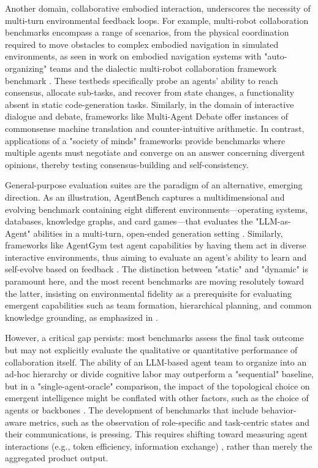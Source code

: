 \documentclass[11pt,a4paper]{article}
\begin{document}
Another domain, collaborative embodied interaction, underscores the necessity of multi-turn environmental feedback loops. For example, multi-robot collaboration benchmarks encompass a range of scenarios, from the physical coordination required to move obstacles to complex embodied navigation in simulated environments, as seen in work on embodied navigation systems with "auto-organizing" teams and the dialectic multi-robot collaboration framework benchmark \cite{arxiv:2403.08282v2,arxiv:2307.04738v1}. These testbeds specifically probe an agents' ability to reach consensus, allocate sub-tasks, and recover from state changes, a functionality absent in static code-generation tasks. Similarly, in the domain of interactive dialogue and debate, frameworks like Multi-Agent Debate \cite{arxiv:2305.19118v1} offer instances of commonsense machine translation and counter-intuitive arithmetic. In contrast, applications of a "society of minds" frameworks \cite{arxiv:2309.13007v2} provide benchmarks where multiple agents must negotiate and converge on an answer concerning divergent opinions, thereby testing consensus-building and self-consistency.

General-purpose evaluation suites are the paradigm of an alternative, emerging direction. As an illustration, AgentBench captures a multidimensional and evolving benchmark containing eight different environments---operating systems, databases, knowledge graphs, and card games---that evaluates the "LLM-as-Agent" abilities in a multi-turn, open-ended generation setting \cite{arxiv:2308.03688v2}. Similarly, frameworks like AgentGym test agent capabilities by having them act in diverse interactive environments, thus aiming to evaluate an agent's ability to learn and self-evolve based on feedback \cite{arxiv:2406.04151v1}. The distinction between "static" and "dynamic" is paramount here, and the most recent benchmarks are moving resolutely toward the latter, insisting on environmental fidelity as a prerequisite for evaluating emergent capabilities such as team formation, hierarchical planning, and common knowledge grounding, as emphasized in \cite{arxiv:2406.07155v1}.

However, a critical gap persists: most benchmarks assess the final task outcome but may not explicitly evaluate the qualitative or quantitative performance of collaboration itself. The ability of an LLM-based agent team to organize into an ad-hoc hierarchy or divide cognitive labor may outperform a "sequential" baseline, but in a "single-agent-oracle" comparison, the impact of the topological choice on emergent intelligence might be conflated with other factors, such as the choice of agents or backbones \cite{arxiv:2310.02170v1,arxiv:2308.05960v1}. The development of benchmarks that include behavior-aware metrics, such as the observation of role-specific and task-centric states and their communications, is pressing. This requires shifting toward measuring agent interactions (e.g., token efficiency, information exchange) \cite{arxiv:2308.05960v1}, rather than merely the aggregated product output.
\end{document}
